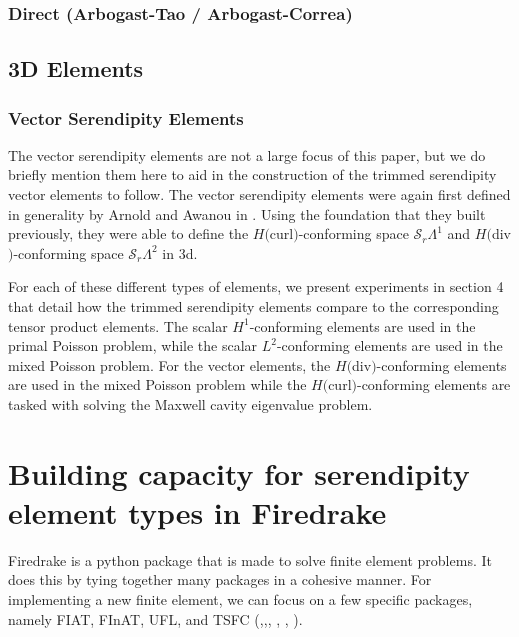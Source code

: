 \documentclass[manuscript,screen]{acmart}
\newcommand{\calS}{\mathcal{S}}
\newcommand{\hcurl}{$H($curl$)$}
\newcommand{\hdiv}{$H($div$)$}
\begin{document}
  \subsubsection{Direct (Arbogast-Tao / Arbogast-Correa)}
  
  \subsection{3D Elements}
  
  
  \subsubsection{Vector Serendipity Elements}
  
  The vector serendipity elements are not a large focus of this paper, but we do briefly mention them here to aid in the construction of the trimmed serendipity vector elements to follow.  The vector serendipity elements were again first defined in generality by Arnold and Awanou in \cite{arnold2014finite}.  Using the foundation that they built previously, they were able to define the \hcurl-conforming space $\calS_r \Lambda^1$ and \hdiv-conforming space $\calS_r \Lambda^2$ in 3d.  
  
  
   For each of these different types of elements, we present experiments in section 4 that detail how the trimmed serendipity elements compare to the corresponding tensor product elements.  The scalar $H^1$-conforming elements are used in the primal Poisson problem, while the scalar $L^2$-conforming elements are used in the mixed Poisson problem.  For the vector elements, the \hdiv-conforming elements are used in the mixed Poisson problem while the \hcurl-conforming elements are tasked with solving the Maxwell cavity eigenvalue problem.

  
  \section{Building capacity for serendipity element types in Firedrake}
  \label{sec:buildcap}
  
  Firedrake is a python package that is made to solve finite element problems.  It does this by tying together many packages in a cohesive manner.  For implementing a new finite element, we can focus on a few specific packages, namely FIAT, FInAT, UFL, and TSFC (\cite{alnaes2012ufl},\cite{hamfinat},\cite{homolya2017exposing}, \cite{homolya2018tsfc}, \cite{kirby2004algorithm}, \cite{kirby2012fiat}).  
  
\end{document}
